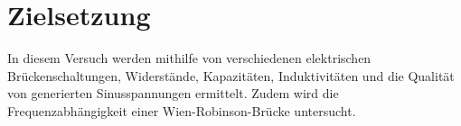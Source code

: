 \section{Zielsetzung}

\label{sec:Zielsetzung}

In diesem Versuch werden mithilfe von verschiedenen elektrischen Brückenschaltungen, Widerstände,
Kapazitäten, Induktivitäten und die Qualität von generierten Sinusspannungen ermittelt. Zudem wird
die Frequenzabhängigkeit einer Wien-Robinson-Brücke untersucht.
